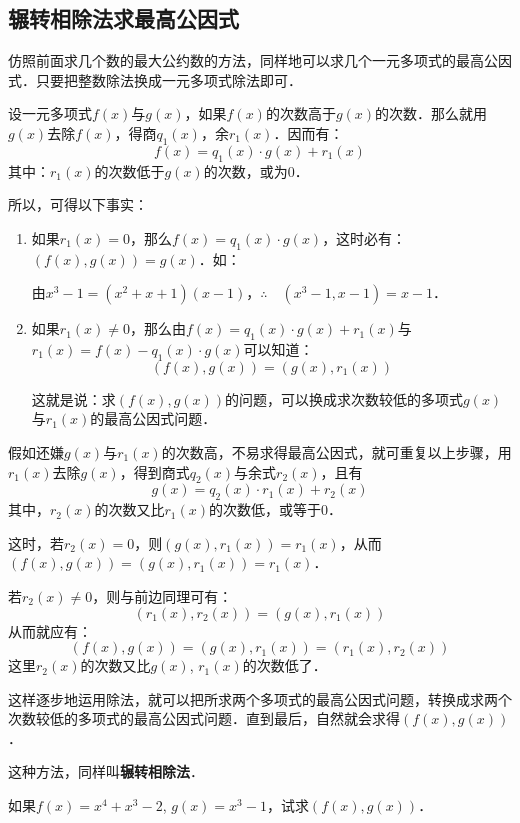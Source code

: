 \subsection{辗转相除法求最高公因式}
仿照前面求几个数的最大公约数的方法，同样地可以求几个一元多项式的最高公因式．只要把整数除法换成一元多项式除法即可．

设一元多项式$f(x)$与$g(x)$，如果$f(x)$的次数高于$g(x)$的次数．那么就用$g(x)$去除$f(x)$，得商$q_1(x)$，余$r_1(x)$．因而有：
\[f(x)=q_1(x)\cdot g(x)+r_1(x)\]
其中：$r_1(x)$的次数低于$g(x)$的次数，或为0．

所以，可得以下事实：
\begin{enumerate}
    \item 如果$r_1(x)=0$，那么$f(x)=q_1(x)\cdot g(x)$，这时必有：$(f(x),g(x))=g(x)$．如：
    
    由$x^3-1=(x^2+x+1)(x-1)$，$\therefore\quad (x^3-1,x-1)=x-1$．

\item 如果$r_1(x)\ne 0$，那么由$f(x)=q_1(x)\cdot g(x)+r_1(x)$与$r_1(x)=f(x)-q_1(x)\cdot g(x)$可以知道：
\[(f(x),g(x))=(g(x),r_1(x))\]

这就是说：求$(f(x),g(x))$的问题，可以换成求次数较低的多项式$g(x)$与$r_1(x)$的最高公因式问题．
\end{enumerate}


假如还嫌$g(x)$与$r_1(x)$的次数高，不易求得最高公因式，就可重复以上步骤，用$r_1(x)$去除$g(x)$，得到商式$q_2(x)$与余式$r_2(x)$，且有
\[g (x) =q_2 (x) \cdot r_1 (x) +r_2 (x) \]
其中，$r_2(x)$的次数又比$r_1(x)$的次数低，或等于0．

这时，若$r_2(x)=0$，则$(g(x),r_1(x))=r_1(x)$，从而$(f(x),g(x))=(g(x), r_1(x)) =r_1 (x)$．

若$r_2(x)\ne 0$，则与前边同理可有：
$$(r_1 (x), r_2(x))=(g(x),r_1(x))$$
从而就应有：
\[( f (x) ,g (x) ) = (g (x) ,r_1 (x))=(r_1(x),r_2(x))\]
这里$r_2(x)$的次数又比$g(x)$, $r_1(x)$的次数低了．

这样逐步地运用除法，就可以把所求两个多项式的最高公因式问题，转换成求两个次数较低的多项式的最高公因式问题．直到最后，自然就会求得$(f(x),g (x) )$．

这种方法，同样叫\textbf{辗转相除法}．



\begin{example}
如果$f(x)=x^4+x^3-2$, $g(x)=x^3-1$，试求$(f(x),g(x))$．
\end{example}


